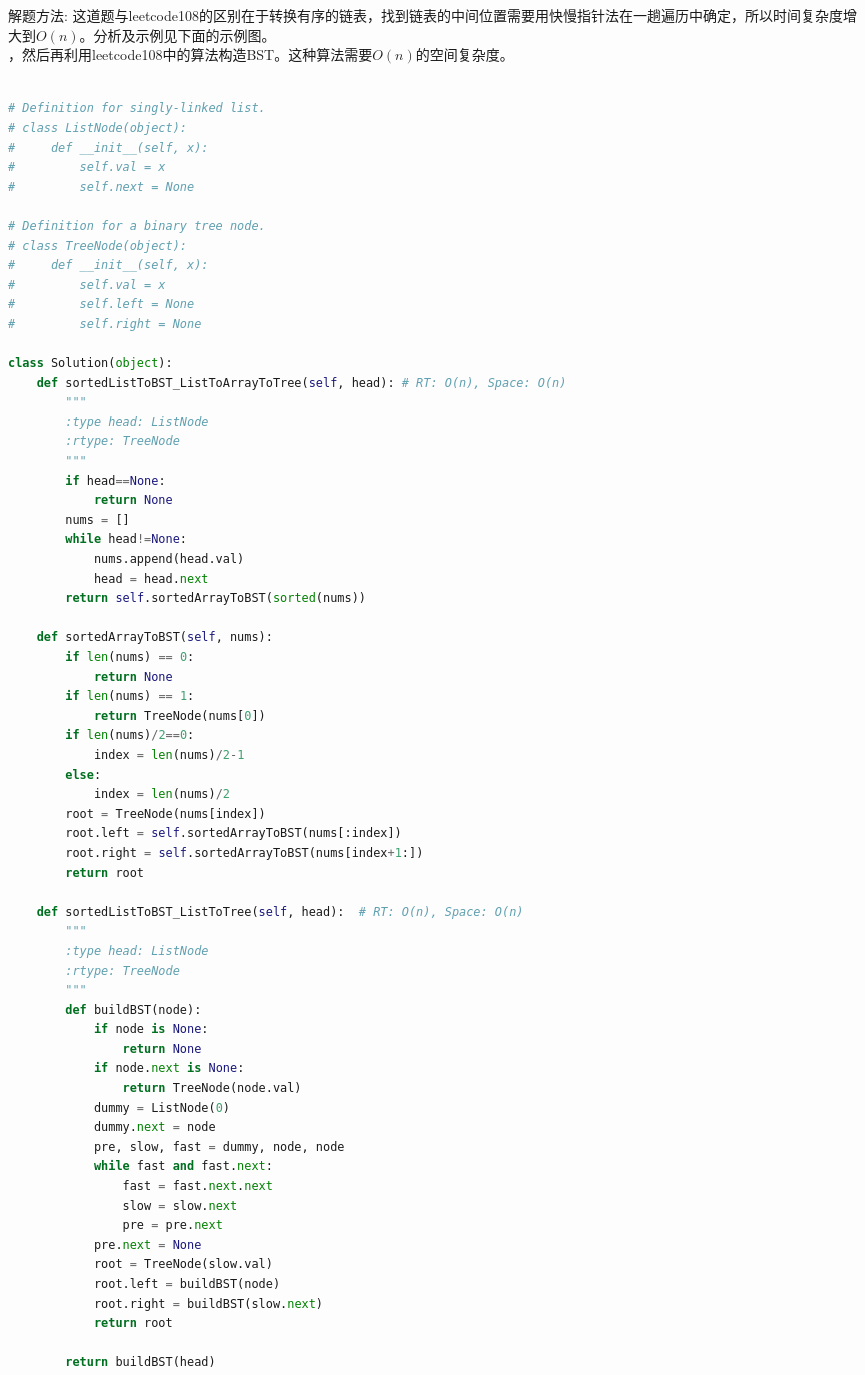 \documentclass[a4paper,10pt]{article}
\begin{document}
\begin{CJK*}{UTF8}{gbsn}
\noindent 解题方法: 这道题与leetcode108的区别在于转换有序的链表，找到链表的中间位置需要用快慢指针法在一趟遍历中确定，所以时间复杂度增大到$O(n)$。分析及示例见下面的示例图。\\

，然后再利用leetcode108中的算法构造BST。这种算法需要$O(n)$的空间复杂度。
\end{CJK*}

\begin{lstlisting}[language=Python, caption=Problem109. Convert Sorted List to Binary Search Tree]

# Definition for singly-linked list.
# class ListNode(object):
#     def __init__(self, x):
#         self.val = x
#         self.next = None

# Definition for a binary tree node.
# class TreeNode(object):
#     def __init__(self, x):
#         self.val = x
#         self.left = None
#         self.right = None

class Solution(object):
    def sortedListToBST_ListToArrayToTree(self, head): # RT: O(n), Space: O(n)
        """
        :type head: ListNode
        :rtype: TreeNode
        """
        if head==None:
            return None
        nums = []
        while head!=None:
            nums.append(head.val)
            head = head.next
        return self.sortedArrayToBST(sorted(nums))
    
    def sortedArrayToBST(self, nums):
        if len(nums) == 0:
            return None
        if len(nums) == 1:
            return TreeNode(nums[0])
        if len(nums)/2==0:
            index = len(nums)/2-1
        else:
            index = len(nums)/2
        root = TreeNode(nums[index])
        root.left = self.sortedArrayToBST(nums[:index])
        root.right = self.sortedArrayToBST(nums[index+1:])
        return root
    
    def sortedListToBST_ListToTree(self, head):  # RT: O(n), Space: O(n)
        """
        :type head: ListNode
        :rtype: TreeNode
        """
        def buildBST(node):
            if node is None:
                return None
            if node.next is None:
                return TreeNode(node.val)
            dummy = ListNode(0)
            dummy.next = node
            pre, slow, fast = dummy, node, node
            while fast and fast.next:
                fast = fast.next.next
                slow = slow.next
                pre = pre.next
            pre.next = None
            root = TreeNode(slow.val)
            root.left = buildBST(node)
            root.right = buildBST(slow.next)
            return root

        return buildBST(head)
\end{lstlisting}
\end{document}

